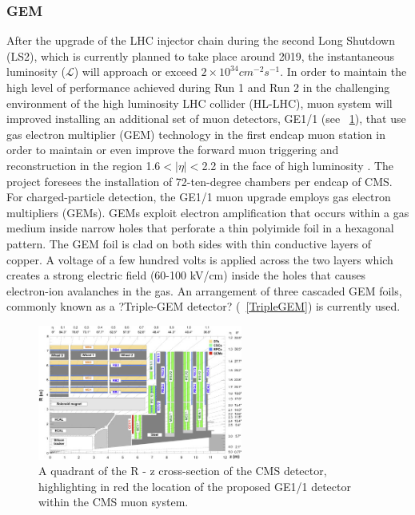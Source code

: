 \subsubsection{GEM}
After the upgrade of the LHC injector chain during the second Long Shutdown (LS2), which is currently planned to take place around 2019, the instantaneous luminosity ($\mathcal{L}$) will approach or exceed $2\times10^{34} cm^{-2}s^{-1}$. In order to maintain the high level of performance achieved during Run 1 and Run 2  in the challenging environment of the high luminosity LHC collider (HL-LHC), muon system will improved installing an additional set of muon detectors, GE1/1 (see \figurename~\ref{GEM}), that use gas electron multiplier (GEM) technology in the first endcap muon station in order to maintain or even improve the forward muon triggering and reconstruction in the region 1.6$<|\eta|<$2.2 in the face of high luminosity \cite{GEM}. The project foresees the installation of 72-ten-degree chambers per endcap of CMS. For charged-particle detection, the GE1/1 muon upgrade employs gas electron multipliers (GEMs). GEMs exploit electron amplification that occurs within a gas medium inside narrow holes that perforate a thin polyimide foil in a hexagonal pattern. The GEM foil is clad on both sides with thin conductive layers of copper. A voltage of a few hundred volts is applied across the two layers which creates a strong electric field (60-100 kV/cm) inside the holes that causes electron-ion avalanches in the gas. An arrangement of three cascaded GEM foils, commonly known as a ?Triple-GEM detector? (\figurename~\ref{TripleGEM}) is currently used.
\begin{figure}[h!]
\centering
\includegraphics[width=0.6\textwidth]{Images/GEM}
\caption{A quadrant of the R - z cross-section of the CMS detector, highlighting in red the location of the proposed GE1/1 detector within the CMS muon system.}
\label{GEM}
\end{figure}
